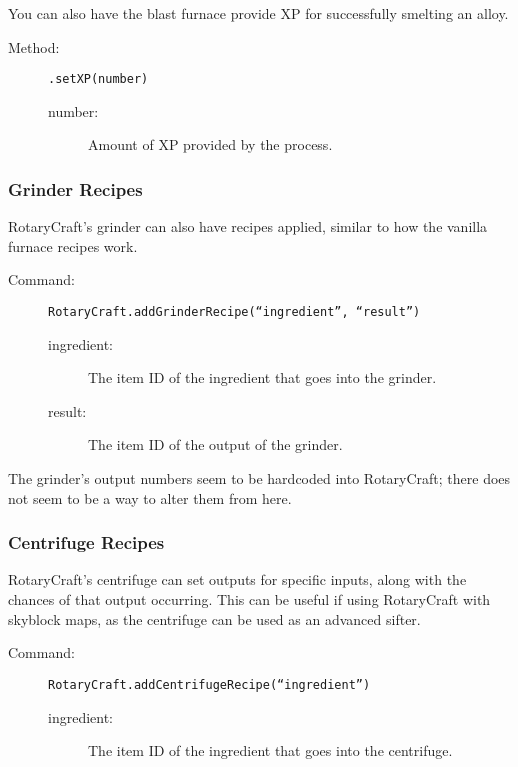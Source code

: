\documentclass[letterpaper,titlepage,12pt]{article}
\begin{document}
You can also have the blast furnace provide XP for successfully smelting an alloy.

\begin{description}
\item[Method:] \texttt{.setXP(number)}
\begin{description}
\item [number:] Amount of XP provided by the process.
\end{description}
\end{description}

\subsubsection{Grinder Recipes}

RotaryCraft's grinder can also have recipes applied, similar to how the vanilla furnace recipes work.

\begin{description}
\item[Command:] \texttt{RotaryCraft.addGrinderRecipe(``ingredient'', ``result'')}
\begin{description}
\item [ingredient:] The item ID of the ingredient that goes into the grinder.
\item [result:] The item ID of the output of the grinder.
\end{description}
\end{description}

The grinder's output numbers seem to be hardcoded into RotaryCraft; there does not seem to be a way to alter them from here.

\subsubsection{Centrifuge Recipes}

RotaryCraft's centrifuge can set outputs for specific inputs, along with the chances of that output occurring.  This can be useful if using RotaryCraft with skyblock maps, as the centrifuge can be used as an advanced sifter.  

\begin{description}
\item[Command:] \texttt{RotaryCraft.addCentrifugeRecipe(``ingredient'')}
\begin{description}
\item [ingredient:] The item ID of the ingredient that goes into the centrifuge.
\end{description}
\end{description}
\end{document}
